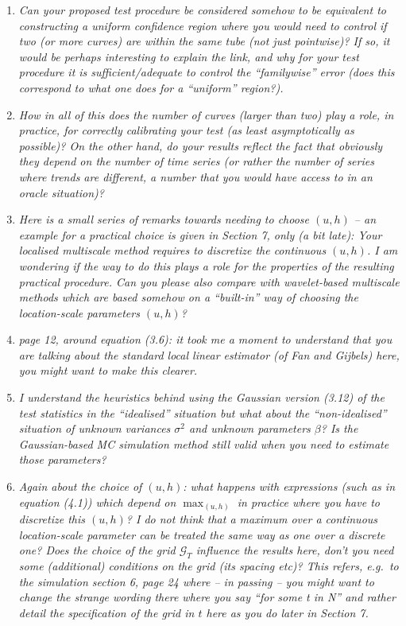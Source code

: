 \documentclass[a4paper,12pt]{article}
\begin{document}
\begin{enumerate}[label=\arabic*.,leftmargin=0.6cm]
\item \textit{Can your proposed test procedure be considered somehow to be equivalent to constructing a uniform confidence region where you would need to control if two (or more curves) are within the same tube (not just pointwise)? If so, it would be perhaps interesting to explain the link, and why for your test procedure it is sufficient/adequate to control the ``familywise'' error (does this correspond to what one does for a ``uniform'' region?).}


\item \textit{How in all of this does the number of curves (larger than two) play a role, in practice, for correctly calibrating your test (as least asymptotically as possible)? On the other hand, do your results reflect the fact that obviously they depend on the number of time series (or rather the number of series where trends are different, a number that you would have access to in an oracle situation)?}


\item \textit{Here is a small series of remarks towards needing to choose $(u, h)$ -- an example for a practical choice is given in Section 7, only (a bit late): Your localised multiscale method requires to discretize the continuous $(u, h)$. I am wondering if the way to do this plays a role for the properties of the resulting practical procedure. Can you please also compare with wavelet-based multiscale methods which are based somehow on a ``built-in'' way of choosing the location-scale parameters $(u, h)$?}  


\item \textit{page 12, around equation (3.6): it took me a moment to understand that you are talking about the standard local linear estimator (of Fan and Gijbels) here, you might want to make this clearer.}


\item \textit{I understand the heuristics behind using the Gaussian version (3.12) of the test statistics in the ``idealised'' situation but what about the ``non-idealised'' situation of unknown variances $\sigma^ 2$ and unknown parameters $\beta$? Is the Gaussian-based MC simulation method still valid when you need to estimate those parameters?}  


\item \textit{Again about the choice of $(u, h)$: what happens with expressions (such as in equation (4.1)) which depend on $\max_{(u,h)}$ in practice where you have to discretize this $(u, h)$? I do not think that a maximum over a continuous location-scale parameter can be treated the same way as one over a discrete one? Does the choice of the grid $\mathcal{G}_T$ influence the results here, don't you need some (additional) conditions on the grid (its spacing etc)? This refers, e.g.\ to the simulation section 6, page 24 where -- in passing -- you might want to change the strange wording there where you say ``for some t in N'' and rather detail the specification of the grid in $t$ here as you do later in Section 7.}  



\end{enumerate}
\end{document}

